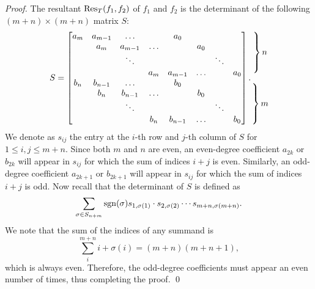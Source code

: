 \begin{proof}
  The resultant $\operatorname{Res}_T(f_1,f_2)$ of $f_1$ and $f_2$ is the
  determinant of the following $(m+n)\times(m+n)$ matrix $S$:
  \begin{equation}
    \label{eq:resultant}
    S = \begin{bmatrix}
      a_m & a_{m-1} & \ldots & & a_0 & & &  \\
      & a_m & a_{m-1} & \ldots & & a_0  & &  \\
      & & \ddots & & & & \ddots &  \\
      & & & a_m & a_{m-1} & \ldots & & a_0  \\
      b_n & b_{n-1} & \ldots & & b_0 & & &  \\
      & b_n & b_{n-1} & \ldots & & b_0  & &  \\
      & & \ddots & & & & \ddots &  \\
      & & & b_n & b_{n-1} & \ldots & & b_0
    \end{bmatrix}.
    \begin{tabular}{@{}c@{}}
      $\left.\begin{tabular}{@{}c@{}} \\ \\ \\ \\\end{tabular}\right\} n$\\
      \\
      $\left.\begin{tabular}{@{}c@{}} \\ \\ \\ \\\end{tabular}\right\} m$\\
    \end{tabular}
  \end{equation}
  We denote as $s_{ij}$ the entry at the $i$-th row and $j$-th column
  of $S$ for $1\leq i,j\leq m+n$.
  Since both $m$ and $n$ are even, an even-degree coefficient $a_{2k}$
  or $b_{2k}$ will appear in $s_{ij}$ for which the sum of indices
  $i+j$ is even.
  Similarly, an odd-degree coefficient $a_{2k+1}$ or $b_{2k+1}$ will
  appear in $s_{ij}$ for which the sum of indices $i+j$ is odd.
  Now recall that the determinant of $S$ is defined as
  \[ \sum_{\sigma\in S_{n+m}}\operatorname{sgn}(\sigma)s_{1,\sigma(1)}\cdot
    s_{2,\sigma(2)}\cdots s_{m+n,\sigma(m+n)}. \]
  We note that the sum of the indices of any summand is
  \[ \sum_i^{m+n}i+\sigma(i)=(m+n)(m+n+1), \] which is always even.
  Therefore, the odd-degree coefficients must appear an even number of
  times, thus completing the proof.
  \qed
\end{proof}

